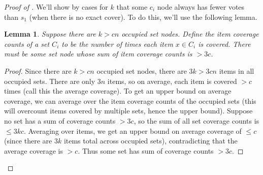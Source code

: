 \documentclass{article}
\theoremstyle{theorem}
\newtheorem{lemma}{Lemma}
\theoremstyle{definition}
\begin{document}
\begin{proof}[Proof of ]
 We'll show by cases for $k$ that some $c_i$ node always has fewer votes than $s_1$ (when there is no exact cover). To do this, we'll use the following lemma.
 \begin{lemma}\label{lemma:average-coverage}
 Suppose there are $k> cn$ occupied set nodes. Define the item coverage counts of a set $C_i$ to be the number of times each item $x\in C_i$ is covered. There must be some set node whose sum of item coverage counts is $> 3c$. 
 \end{lemma}
 \begin{proof}
Since there are $k > cn$ occupied set nodes, there are $3k > 3cn$ items in all occupied sets. There are only $3n$ items, so on average, each item is covered $> c$ times (call this the average coverage). To get an upper bound on average coverage, we can average over the item coverage counts of the occupied sets (this will overcount items covered by multiple sets, hence the upper bound). Suppose no set has a sum of coverage counts $> 3c$, so the sum of all set coverage counts is $\le 3kc$. Averaging over items, we get an upper bound on average coverage of $\le c$ (since there are $3k$ items total across occupied sets), contradicting that the average coverage is $> c$. Thus some set has sum of coverage counts $> 3c$. 
 \end{proof}
 

\end{proof}
\end{document}
